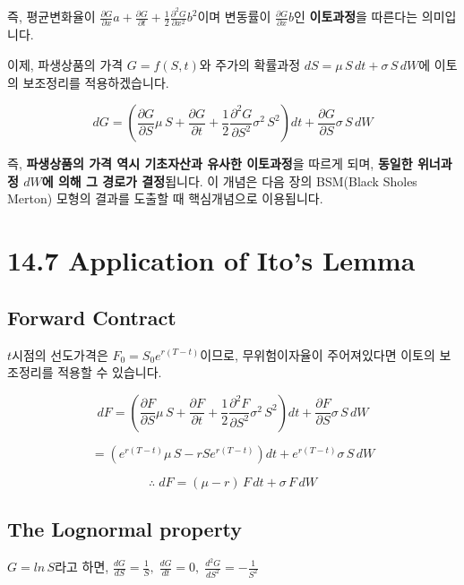 \documentclass[
  letterpaper,
  DIV=11,
  numbers=noendperiod]{scrreprt}
\begin{document}
즉, 평균변화율이
\(\frac{\partial G}{\partial x}a+\frac{\partial G}{\partial t}+\frac{1}{2}\frac{\partial^2 G}{\partial x^2}b^2\)이며
변동률이 \(\frac{\partial G}{\partial x}b\)인 \textbf{이토과정}을
따른다는 의미입니다.

이제, 파생상품의 가격 \(G=f(S,t)\)와 주가의 확률과정
\(dS=\mu\,S\,dt+\sigma\,S\,dW\)에 이토의 보조정리를 적용하겠습니다.

\[dG=(\frac{\partial G}{\partial S}\mu\,S+\frac{\partial G}{\partial t}+\frac{1}{2}\frac{\partial^2 G}{\partial S^2}\sigma^2\,S^2)dt+\frac{\partial G}{\partial S}\sigma\,S\,dW\]

즉, \textbf{파생상품의 가격 역시 기초자산과 유사한 이토과정}을 따르게
되며, \textbf{동일한 위너과정 \(dW\)에 의해 그 경로가 결정}됩니다. 이
개념은 다음 장의 BSM(Black Sholes Merton) 모형의 결과를 도출할 때
핵심개념으로 이용됩니다.

\section*{14.7 Application of Ito's
Lemma}\label{application-of-itos-lemma}


\subsection*{Forward Contract}\label{forward-contract}

\(t\)시점의 선도가격은 \(F_0=S_0e^{r(T-t)}\)이므로, 무위험이자율이
주어져있다면 이토의 보조정리를 적용할 수 있습니다.

\[dF=(\frac{\partial F}{\partial S}\mu\,S+\frac{\partial F}{\partial t}+\frac{1}{2}\frac{\partial^2 F}{\partial S^2}\sigma^2\,S^2)dt+\frac{\partial F}{\partial S}\sigma\,S\,dW\]

\[=(e^{r(T-t)}\mu\,S-rSe^{r(T-t)})dt+e^{r(T-t)}\sigma\,S\,dW\]

\[\therefore\;dF=(\mu-r)\,F\,dt+\sigma\,F\,dW\]

\subsection*{The Lognormal property}\label{the-lognormal-property}

\(G=ln\,S\)라고 하면,
\(\frac{dG}{dS}=\frac{1}{S},\;\frac{dG}{dt}=0,\;\frac{d^2G}{dS^2}=-\frac{1}{S^2}\)
\end{document}
